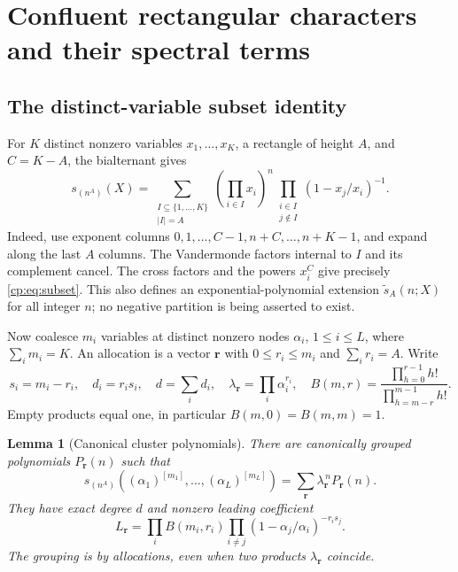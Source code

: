 \documentclass[11pt]{article}
\newtheorem{lemma}[theorem]{Lemma}
\theoremstyle{definition}
\theoremstyle{remark}
\newcommand{\rep}[2]{(#1)^{[#2]}}
\theoremstyle{definition}
\theoremstyle{plain}
\numberwithin{equation}{section}
\begin{document}
\section{Confluent rectangular characters and their spectral terms}
\label{cp:sec:confluence}

\subsection{The distinct-variable subset identity}
For $K$ distinct nonzero variables $x_1,\ldots,x_K$, a rectangle of height
$A$, and $C=K-A$, the bialternant gives
\begin{equation}
 s_{(n^A)}(X)
 =\sum_{\substack{I\subseteq\{1,\ldots,K\}\\ |I|=A}}
 \left(\prod_{i\in I}x_i\right)^n
 \prod_{\substack{i\in I\\j\notin I}}(1-x_j/x_i)^{-1}.
 \label{cp:eq:subset}
\end{equation}
Indeed, use exponent columns
$0,1,\ldots,C-1,n+C,\ldots,n+K-1$, and expand along the last $A$
columns. The Vandermonde factors internal to $I$ and its complement cancel.
The cross factors and the powers $x_i^C$ give precisely
\eqref{cp:eq:subset}. This also defines an exponential-polynomial extension
$\widetilde s_A(n;X)$ for all integer $n$; no negative partition is being
asserted to exist.

Now coalesce $m_i$ variables at distinct nonzero nodes $\alpha_i$,
$1\le i\le L$, where $\sum_i m_i=K$. An allocation is a vector
$\boldsymbol r$ with $0\le r_i\le m_i$ and $\sum_i r_i=A$. Write
\begin{equation}
 s_i=m_i-r_i,\quad d_i=r_is_i,\quad d=\sum_i d_i,\quad
 \lambda_{\boldsymbol r}=\prod_i\alpha_i^{r_i},\quad
 B(m,r)=\frac{\prod_{h=0}^{r-1}h!}{\prod_{h=m-r}^{m-1}h!}.
 \label{cp:eq:clusterdata}
\end{equation}
Empty products equal one, in particular $B(m,0)=B(m,m)=1$.

\begin{lemma}[Canonical cluster polynomials]
\label{cp:lem:cluster}
There are canonically grouped polynomials $P_{\boldsymbol r}(n)$ such that
\begin{equation}
 s_{(n^A)}(\rep{\alpha_1}{m_1},\ldots,\rep{\alpha_L}{m_L})
 =\sum_{\boldsymbol r}\lambda_{\boldsymbol r}^{\,n}P_{\boldsymbol r}(n).
 \label{cp:eq:clusters}
\end{equation}
They have exact degree $d$ and nonzero leading coefficient
\begin{equation}
 \boxed{\displaystyle
 L_{\boldsymbol r}=\prod_i B(m_i,r_i)
 \prod_{i\ne j}(1-\alpha_j/\alpha_i)^{-r_i s_j}.}
 \label{cp:eq:leading}
\end{equation}
The grouping is by allocations, even when two products
$\lambda_{\boldsymbol r}$ coincide.
\end{lemma}
\end{document}
